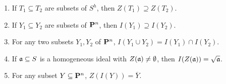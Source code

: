 \documentclass[10pt]{amsart}
\begin{document}
\begin{solution}
\begin{luke}
\begin{description}
        \end{description}
    \end{luke}



\end{solution}

\begin{exercise}[Exercise 2.3]
    \begin{enumerate}
        \item If $T_1 \subseteq T_2$ are subsets of $S^h$, then $Z(T_1) \supseteq
        Z(T_2)$.
      \item If $Y_1 \subseteq Y_2$ are subsets of ${\bf P}^n$, then $I(Y_1) \supseteq
        I(Y_2)$.
      \item For any two subsets $Y_1,Y_2$ of ${\bf P}^n$, $I(Y_1 \cup Y_2) = I(Y_1)
        \cap I(Y_2)$.
      \item If $\mathfrak{a} \subseteq S$ is a homogeneous ideal with
        $Z(\mathfrak{a}) \ne \emptyset$, then $I(Z(\mathfrak{a})) =
        \sqrt{\mathfrak{a}}$.
      \item For any subset $Y \subseteq {\bf P}^n$, $Z(I(Y)) = \overline{Y}$.
    \end{enumerate}
\end{exercise}
\end{document}
